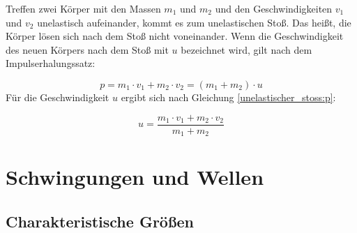 \documentclass[a4paper]{article}
\begin{document}
				Treffen zwei Körper mit den Massen $m_1$ und $m_2$ und den Geschwindigkeiten $v_1$ und $v_2$ unelastisch aufeinander, kommt es zum unelastischen Stoß. Das heißt, die Körper lösen sich nach dem Stoß nicht voneinander. Wenn die Geschwindigkeit des neuen Körpers nach dem Stoß mit $u$ bezeichnet wird, gilt nach dem Impulserhalungssatz:
				
				\begin{equation}\label{unelastischer_stoss:p}
					p=m_1 \cdot v_1 + m_2 \cdot v_2 = (m_1 + m_2) \cdot u
				\end{equation}
				Für die Geschwindigkeit $u$ ergibt sich nach Gleichung \ref{unelastischer_stoss:p}:
				
				\begin{equation}
					u=\frac{m_1 \cdot v_1 + m_2 \cdot v_2}{m_1 + m_2}
				\end{equation}
			
			
	\section{Schwingungen und Wellen}			
		\subsection{Charakteristische Größen}
\end{document}
